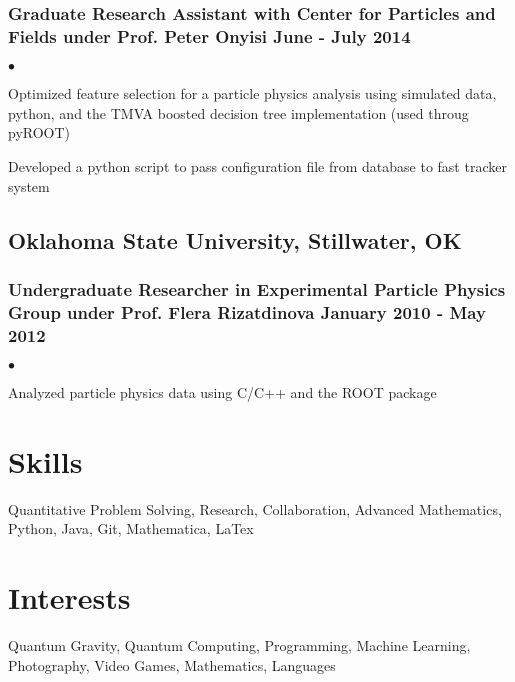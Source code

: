 \documentclass[letterpaper]{article}
\renewenvironment{itemize}{
  \begin{list}{$\bullet$}{
    \setlength{\itemsep}{0em}
    \setlength{\parskip}{0em}
    \setlength{\parsep}{0em} 
    \setlength{\topsep}{0em} 
  }
}{
  \end{list}
}
\begin{document}
\subsubsection*{Graduate Research Assistant with Center for Particles and Fields under Prof. Peter Onyisi \hfill June - July 2014}
    \begin{itemize}
    
        \item Optimized feature selection for a particle physics analysis using simulated data, python, and the TMVA boosted decision tree implementation (used throug pyROOT)
        \item Developed a python script to pass configuration file from database to fast tracker system
        
    \end{itemize}

\subsection*{Oklahoma State University, Stillwater, OK}
\subsubsection*{Undergraduate Researcher in Experimental Particle Physics Group under Prof. Flera Rizatdinova \hfill January 2010 - May 2012}
    \begin{itemize}
        \item Analyzed particle physics data using C/C++ and the ROOT package
    \end{itemize}

\section*{Skills}

Quantitative Problem Solving, Research, Collaboration, Advanced Mathematics, Python, Java, Git, Mathematica, LaTex

\section*{Interests}

Quantum Gravity, Quantum Computing, Programming, Machine Learning, Photography, Video Games, Mathematics, Languages
\end{document}
